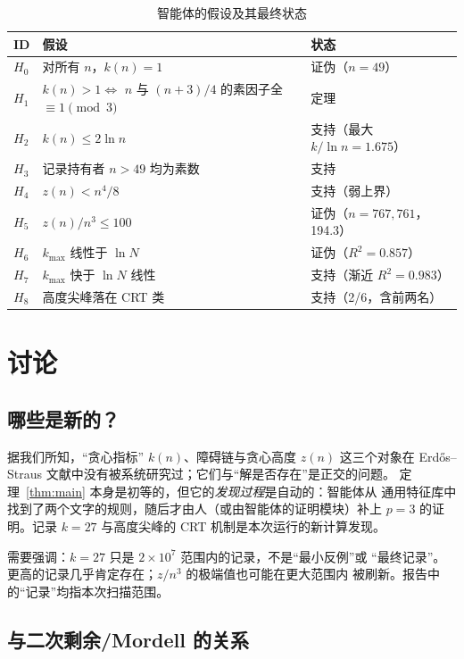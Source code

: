 \documentclass[11pt,a4paper]{ctexart}
\theoremstyle{definition}
\theoremstyle{remark}
\begin{document}
\begin{table}[H]
\centering
\caption{智能体的假设及其最终状态}
\label{tab:hyp}
\small
\begin{tabularx}{\textwidth}{@{}l X l@{}}
\toprule
ID & 假设 & 状态 \\
\midrule
$H_0$ & 对所有 $n$，$k(n)=1$ & 证伪（$n=49$）\\
$H_1$ & $k(n)>1\iff$ $n$ 与 $(n+3)/4$ 的素因子全 $\equiv1\pmod3$ & 定理 \\
$H_2$ & $k(n)\le2\ln n$ & 支持（最大 $k/\ln n=1.675$）\\
$H_3$ & 记录持有者 $n>49$ 均为素数 & 支持 \\
$H_4$ & $z(n)<n^4/8$ & 支持（弱上界）\\
$H_5$ & $z(n)/n^3\le100$ & 证伪（$n=767{,}761$，194.3）\\
$H_6$ & $k_{\max}$ 线性于 $\ln N$ & 证伪（$R^2=0.857$）\\
$H_7$ & $k_{\max}$ 快于 $\ln N$ 线性 & 支持（渐近 $R^2=0.983$）\\
$H_8$ & 高度尖峰落在 CRT 类 & 支持（2/6，含前两名）\\
\bottomrule
\end{tabularx}
\end{table}

\section{讨论}

\subsection{哪些是新的？}

据我们所知，“贪心指标” $k(n)$、障碍链与贪心高度 $z(n)$ 这三个对象在
Erdős--Straus 文献中没有被系统研究过；它们与“解是否存在”是正交的问题。
定理~\ref{thm:main} 本身是初等的，但它的\emph{发现过程}是自动的：智能体从
通用特征库中找到了两个文字的规则，随后才由人（或由智能体的证明模块）补上
$p=3$ 的证明。记录 $k=27$ 与高度尖峰的 CRT 机制是本次运行的新计算发现。

需要强调：$k=27$ 只是 $2\times10^7$ 范围内的记录，不是“最小反例”或
“最终记录”。更高的记录几乎肯定存在；$z/n^3$ 的极端值也可能在更大范围内
被刷新。报告中的“记录”均指本次扫描范围。

\subsection{与二次剩余/Mordell 的关系}
\end{document}
